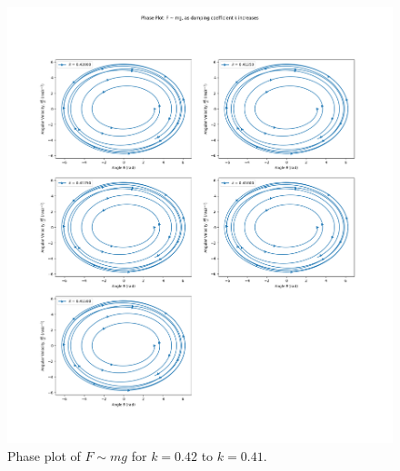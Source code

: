 \documentclass[10pt, twocolumn]{article}
\begin{document}
\begin{figure}[H]
    \centering
    \includegraphics[width = \columnwidth]{Projects/ForcedSimplePendulum/Plots/Phase plot of F~mg as damping coefficient k increases from 0.42 to 0.41.png}
    \caption{Phase plot of $F \sim{mg}$ for $k = 0.42$ to $k = 0.41$.}
    \label{Phase plot of k 0.42 to 0.41}
\end{figure}
\end{document}
